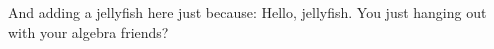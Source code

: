And adding a jellyfish here just because:
Hello, jellyfish. You just hanging out with your algebra friends?
    
    